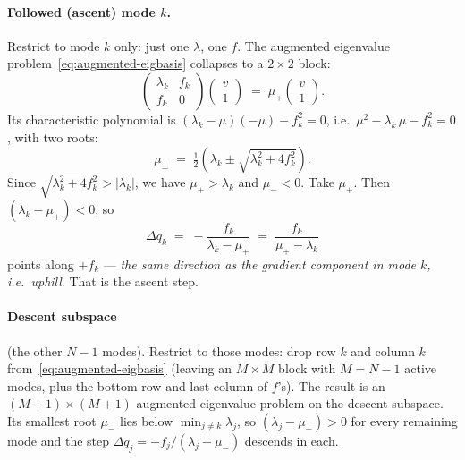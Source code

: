 \documentclass[11pt]{article}
\newcommand{\dq}{\Delta q}
\begin{document}
\paragraph{Followed (ascent) mode $k$.}  Restrict to mode $k$ only: just one
$\lambda$, one $f$.  The augmented eigenvalue problem~\eqref{eq:augmented-eigbasis}
collapses to a $2 \times 2$ block:
\begin{equation}\label{eq:rfo-2x2}
  \begin{pmatrix} \lambda_k & f_k \\ f_k & 0 \end{pmatrix}
  \begin{pmatrix} v \\ 1 \end{pmatrix}
  \;=\; \mu_+ \begin{pmatrix} v \\ 1 \end{pmatrix}.
\end{equation}
Its characteristic polynomial is $(\lambda_k - \mu)(- \mu) - f_k^2 = 0$,
i.e.\ $\mu^2 - \lambda_k\, \mu - f_k^2 = 0$, with two roots:
\begin{equation*}
  \mu_\pm \;=\; \tfrac{1}{2}\!\left(\lambda_k \pm \sqrt{\lambda_k^2 + 4 f_k^2}\right).
\end{equation*}
Since $\sqrt{\lambda_k^2 + 4 f_k^2} > |\lambda_k|$, we have $\mu_+ > \lambda_k$
and $\mu_- < 0$.  Take $\mu_+$.  Then $(\lambda_k - \mu_+) < 0$, so
\begin{equation*}
  \dq_k \;=\; -\frac{f_k}{\lambda_k - \mu_+} \;=\; \frac{f_k}{\mu_+ - \lambda_k}
\end{equation*}
points along $+f_k$ --- \emph{the same direction as the gradient component in
mode $k$, i.e.\ uphill}.  That is the ascent step.

\paragraph{Descent subspace} (the other $N-1$ modes).  Restrict to those
modes: drop row $k$ and column $k$ from~\eqref{eq:augmented-eigbasis}
(leaving an $M \times M$ block with $M = N-1$ active modes, plus the bottom
row and last column of $f$'s).  The result is an $(M+1) \times (M+1)$
augmented eigenvalue problem on the descent subspace.  Its smallest root
$\mu_-$ lies below $\min_{j \neq k} \lambda_j$, so $(\lambda_j - \mu_-) > 0$
for every remaining mode and the step
$\dq_j = -f_j / (\lambda_j - \mu_-)$ descends in each.
\end{document}
